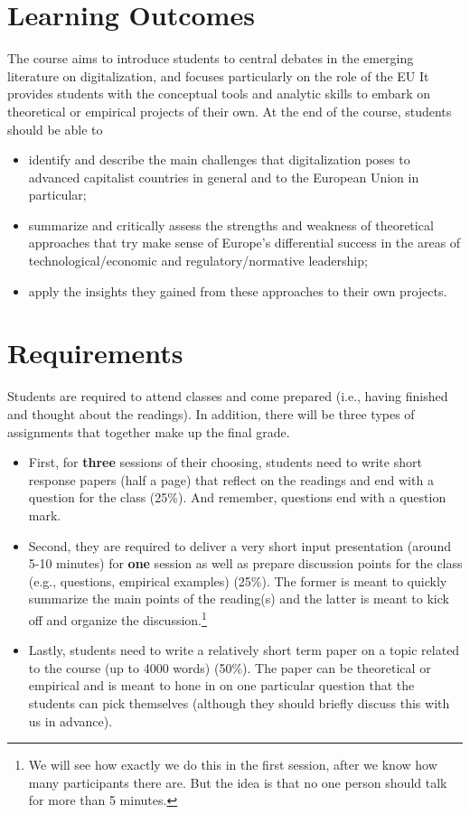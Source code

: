 \documentclass[12pt,]{article}
\begin{document}
\hypertarget{learning-outcomes}{%
\section{Learning Outcomes}\label{learning-outcomes}}

The course aims to introduce students to central debates in the emerging
literature on digitalization, and focuses particularly on the role of
the EU It provides students with the conceptual tools and analytic
skills to embark on theoretical or empirical projects of their own. At
the end of the course, students should be able to

\begin{itemize}
\item
  identify and describe the main challenges that digitalization poses to
  advanced capitalist countries in general and to the European Union in
  particular;
\item
  summarize and critically assess the strengths and weakness of
  theoretical approaches that try make sense of Europe's differential
  success in the areas of technological/economic and
  regulatory/normative leadership;
\item
  apply the insights they gained from these approaches to their own
  projects.
\end{itemize}

\hypertarget{requirements}{%
\section{Requirements}\label{requirements}}

Students are required to attend classes and come prepared (i.e., having
finished and thought about the readings). In addition, there will be
three types of assignments that together make up the final grade.

\begin{itemize}
\item
  First, for \textbf{three} sessions of their choosing, students need to
  write short response papers (half a page) that reflect on the readings
  and end with a question for the class (25\%). And remember, questions
  end with a question mark.
\item
  Second, they are required to deliver a very short input presentation
  (around 5-10 minutes) for \textbf{one} session as well as prepare
  discussion points for the class (e.g., questions, empirical examples)
  (25\%). The former is meant to quickly summarize the main points of
  the reading(s) and the latter is meant to kick off and organize the
  discussion.\footnote{We will see how exactly we do this in the first
    session, after we know how many participants there are. But the idea
    is that no one person should talk for more than 5 minutes.}
\item
  Lastly, students need to write a relatively short term paper on a
  topic related to the course (up to 4000 words) (50\%). The paper can
  be theoretical or empirical and is meant to hone in on one particular
  question that the students can pick themselves (although they should
  briefly discuss this with us in advance).
\end{itemize}
\end{document}
